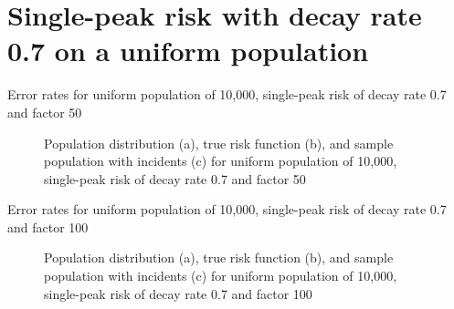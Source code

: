 \section{Single-peak risk with decay rate 0.7 on a uniform population}
\label{sec:app:results_unif_0.7_1h}

\graphicspath{{./results/unif_50_0.7_1h/}}
\makeatletter
{}
\makeatother

\begin{table}[H]
    
    \caption[]{Error rates for uniform population of 10,000, single-peak risk of decay rate 0.7 and factor 50}
    \label{tab:mean_error_rates:unif_50_0.7_1h}
\end{table}

\begin{figure}[H]
    
    \caption[]{Population distribution (a), true risk function (b), and sample population with incidents (c) for uniform population of 10,000, single-peak risk of decay rate 0.7 and factor 50}
    \label{fig:distributions:unif_50_0.7_1h}    
\end{figure}


\graphicspath{{./results/unif_100_0.7_1h/}}
\makeatletter
{}
\makeatother

\begin{table}[H]

\caption[]{Error rates for uniform population of 10,000, single-peak risk of decay rate 0.7 and factor 100}
\label{tab:mean_error_rates:unif_100_0.7_1h}
\end{table}

\begin{figure}[H]
    
    \caption[]{Population distribution (a), true risk function (b), and sample population with incidents (c) for uniform population of 10,000, single-peak risk of decay rate 0.7 and factor 100}
    \label{fig:distributions:unif_100_0.7_1h}    
\end{figure}


\graphicspath{{./results/unif_200_0.7_1h/}}
\makeatletter
{}
\makeatother

